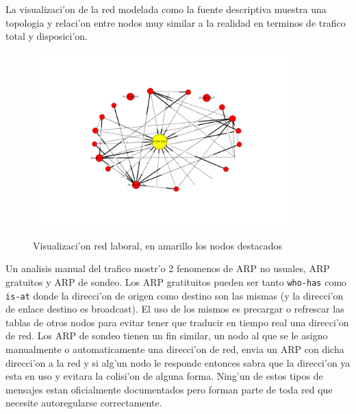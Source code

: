 La visualizaci'on de la red modelada como la fuente descriptiva muestra una topologia y relaci'on entre nodos muy similar
a la realidad en terminos de trafico total y disposici'on.

\begin{figure}[!h]
\centering
\caption{Visualizaci'on red laboral, en amarillo los nodos destacados}
\includegraphics[width=0.9\textwidth]{red2_red}
 \label{fig:red2net}
\end{figure}

Un analisis manual del trafico mostr'o 2 fenomenos de ARP no usuales, ARP gratuitos y ARP de sondeo. Los ARP gratituitos pueden
ser tanto \texttt{who-has} como \texttt{is-at} donde la direcci'on de origen como destino son las mismas (y la direcci'on
de enlace destino es broadcast). El uso de los mismos es precargar o refrescar las tablas de otros nodos para evitar tener
que traducir en tiempo real una direcci'on de red. Los ARP de sondeo tienen un fin similar, un nodo al que se le asigno manualmente
o automaticamente una direcci'on de red, envia un ARP con dicha direcci'on a la red y si alg'un nodo le responde entonces sabra
que la direcci'on ya esta en uso y evitara la colisi'on de alguna forma. Ning'un de estos tipos de mensajes estan oficialmente
documentados pero forman parte de toda red que necesite autoregularse correctamente.\\
